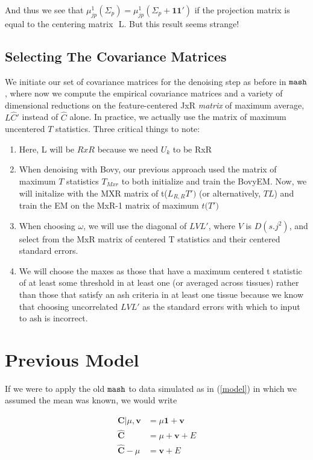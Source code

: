 \documentclass[11pt, oneside]{article}   	%
\newcommand{\ceff}{\bm{C}}
\newcommand{\onemat}{\bm{1}\bm{1}'}
\newcommand{\chat}{\bm{\hat{C}}}
\newcommand{\vb}{\bm{v}}
\def\lstar{\text{ L}}
\def\mash{{\tt mash}}
\begin{document}
\begin{itemize}
And thus we see that $\mu^{1}_{jp} ( \Sigma_p ) =  \mu^{1}_{jp} ( \Sigma_p + \onemat)$ if the projection matrix is equal to the centering matrix $\lstar$. But this result seems strange!

\subsection{Selecting The Covariance Matrices}

We initiate our set of covariance matrices for the denoising step as before in $\mash$, where now we compute the empirical covariance matrices and a variety of dimensional reductions on the feature-centered JxR \textit{matrix} of maximum average, $L \hat{C}' $ instead of $\hat{C}$ alone. In practice, we actually use the matrix of maximum uncentered $T$ statistics. Three critical things to note:

\begin{enumerate}
\item Here, L will be $RxR$ because we need $U_{k}$ to be RxR
\item When denoising with Bovy, our previous approach used the matrix of maximum $T$ statistics $T_{Mxr}$ to both initialize and train the BovyEM. Now, we will initalize with the MXR matrix of t($L_{R,R}T')$ (or alternatively, $TL$) and train the EM on the MxR-1 matrix of maximum $t($\lstar$T')$
\item When choosing $\omega$, we will use the diagonal of $L V L'$, where $V$ is $D(s.j^2)$, and select from the MxR matrix of centered T statistics and their centered standard errors.
\item We will choose the maxes as those that have a maximum centered t statistic of at least some threshold in at least one (or averaged across tissues) rather than those that satisfy an ash criteria in at least one tissue because we know that choosing uncorrelated $L V L'$ as the standard errors with which to input to ash  is incorrect.
\end{enumerate}


\section{Previous Model}

If we were to apply the old $\mash$ to data simulated as in (\ref{model}) in which we assumed the mean was known, we would write

\begin{equation}
\label{mashmodel}
\begin{aligned}
\ceff | \mu, \vb  &= \mu \bm{1} + \vb \\
\chat &= \mu + \vb + E \\
\chat - \mu &= \vb + E \\
\end{aligned}
\end{equation}


\end{itemize}
\end{document}

